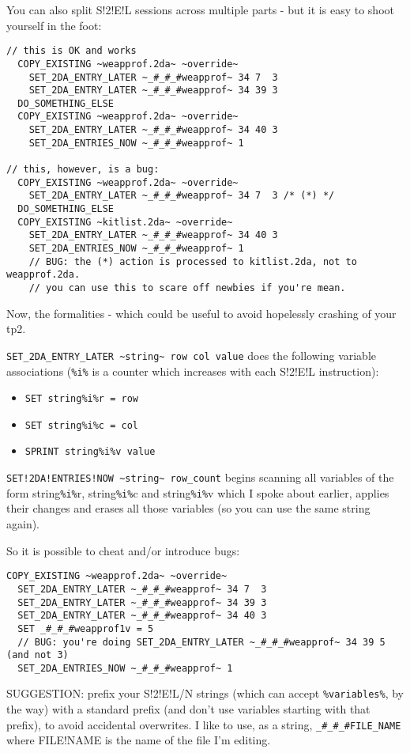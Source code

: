 \documentclass{article}
\def\t#1{{\tt #1}}
\begin{document}
You can also split S!2!E!L sessions across multiple parts - but it is easy to shoot
yourself in the foot:
\begin{verbatim}
// this is OK and works
  COPY_EXISTING ~weapprof.2da~ ~override~
    SET_2DA_ENTRY_LATER ~_#_#_#weapprof~ 34 7  3
    SET_2DA_ENTRY_LATER ~_#_#_#weapprof~ 34 39 3
  DO_SOMETHING_ELSE
  COPY_EXISTING ~weapprof.2da~ ~override~
    SET_2DA_ENTRY_LATER ~_#_#_#weapprof~ 34 40 3
    SET_2DA_ENTRIES_NOW ~_#_#_#weapprof~ 1

// this, however, is a bug:
  COPY_EXISTING ~weapprof.2da~ ~override~
    SET_2DA_ENTRY_LATER ~_#_#_#weapprof~ 34 7  3 /* (*) */
  DO_SOMETHING_ELSE
  COPY_EXISTING ~kitlist.2da~ ~override~
    SET_2DA_ENTRY_LATER ~_#_#_#weapprof~ 34 40 3
    SET_2DA_ENTRIES_NOW ~_#_#_#weapprof~ 1
    // BUG: the (*) action is processed to kitlist.2da, not to weapprof.2da.
    // you can use this to scare off newbies if you're mean.
\end{verbatim}

Now, the formalities - which could be useful to avoid hopelessly crashing of your tp2.

\verb+SET_2DA_ENTRY_LATER ~string~ row col value+
does the following variable associations (\t{\%i\%} is a counter which increases with
each S!2!E!L instruction):
\begin{itemize}
\item \verb+SET string%i%r = row+
\item \verb+SET string%i%c = col+
\item \verb+SPRINT string%i%v value+
\end{itemize}
\verb+SET!2DA!ENTRIES!NOW ~string~ row_count+
begins scanning all variables of the form string\t{\%i\%}r, string\t{\%i\%}c and
string\t{\%i\%}v which I spoke about earlier, applies their changes and erases
all those variables (so you can use the same string again).

So it is possible to cheat and/or introduce bugs:
\begin{verbatim}
COPY_EXISTING ~weapprof.2da~ ~override~
  SET_2DA_ENTRY_LATER ~_#_#_#weapprof~ 34 7  3
  SET_2DA_ENTRY_LATER ~_#_#_#weapprof~ 34 39 3
  SET_2DA_ENTRY_LATER ~_#_#_#weapprof~ 34 40 3
  SET _#_#_#weapprof1v = 5
  // BUG: you're doing SET_2DA_ENTRY_LATER ~_#_#_#weapprof~ 34 39 5 (and not 3)
  SET_2DA_ENTRIES_NOW ~_#_#_#weapprof~ 1
\end{verbatim}

SUGGESTION: prefix your S!2!E!L/N strings (which can accept \t{\%variables\%},
by the way) with a standard prefix (and don't use variables starting with that
prefix), to avoid accidental overwrites. I like to use, as a string,
\verb+_#_#_#FILE_NAME+ where FILE!NAME is the name of the file I'm editing.
\end{document}
